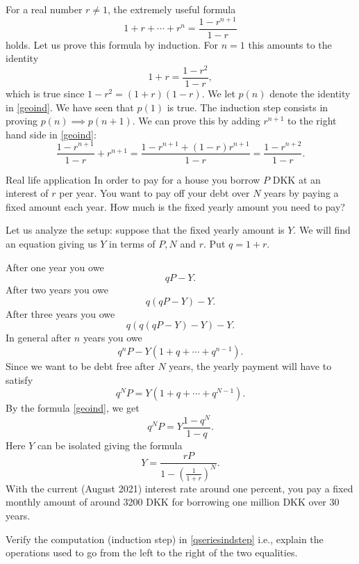 \documentclass{article}
\begin{document}
\begin{example}\label{examplegeomseries}
  For a real number $r\neq 1$, the extremely useful formula
  \begin{equation}\label{geoind}
  1 + r + \cdots + r^n = \frac{1 - r^{n+1}}{1-r}
  \end{equation}
  holds. Let us prove this formula by induction. For $n=1$ this amounts to the identity
  $$
  1 + r = \frac{1-r^2}{1-r},
  $$
  which is true since $1-r^2 = (1+r)(1-r)$. We let $p(n)$ denote
  the identity in \eqref{geoind}. We have seen that $p(1)$ is true. The induction step
  consists in proving $p(n)\implies p(n+1)$. We can prove this
  by adding $r^{n+1}$ to the right hand side in \eqref{geoind}:
  \begin{equation}\label{qseriesindstep}
  \frac{1 - r^{n+1}}{1-r} + r^{n+1} = \frac{1 - r^{n+1} + (1-r) r^{n+1}}{1-r} = \frac{1 - r^{n+2}}{1-r}.
  \end{equation}
\begin{hideinbutton}{Real life application}
    In order to pay for a house you borrow $P$ DKK at an interest of
    $r$ per year. You want to pay off your debt over $N$ years by
    paying a fixed amount each year. How much is the fixed yearly
    amount you need to pay?

    Let us analyze the setup: suppose that the fixed yearly amount
    is $Y$. We will find an equation giving us $Y$ in terms of
    $P, N$ and $r$. Put $q = 1+ r$.

    After one year you owe
    $$
    q P - Y.
    $$
    After two years you owe
    $$
    q(q P - Y) - Y.
    $$
    After three years you owe
    $$
    q ( q ( q P - Y) - Y) - Y.
    $$
    In general after $n$ years you owe
    $$
    q^n P - Y (1 + q + \cdots + q^{n-1}).
    $$
    Since we want to be debt free after $N$ years, the yearly payment will have to satisfy
    $$
    q^N P = Y ( 1 + q + \cdots + q^{N-1}).
    $$
    By the formula \eqref{geoind}, we get
    $$
    q^N P = Y \frac{1-q^N}{1-q}.
    $$
    Here $Y$ can be isolated giving the formula
    $$
    Y = \frac{r P}{1 - \left(\frac{1}{1+r}\right)^N}.
    $$
    With the current (August 2021) interest rate around one percent, you pay a fixed monthly
    amount of around 3200 DKK for borrowing one million DKK over $30$ years.
  \end{hideinbutton}
\end{example}

\beginshex
Verify the computation (induction step) in \eqref{qseriesindstep} i.e., explain
the operations used to go from the left to the right of the two equalities.
\endshex
\end{document}
